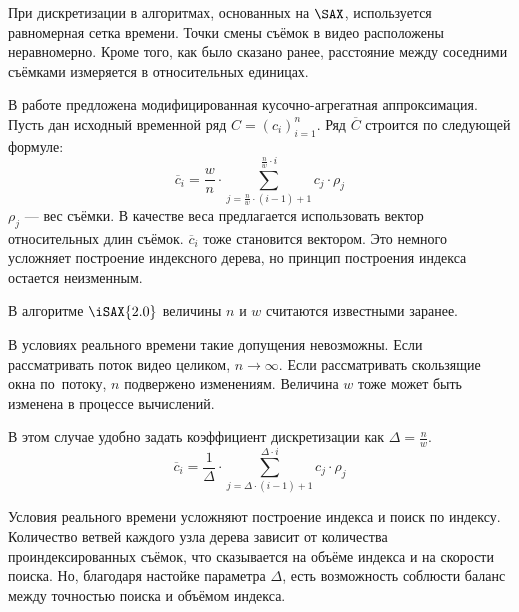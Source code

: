 \documentclass{.local/lib/classes/ndvr-super-article-standalone}
\begin{document}
 
    При дискретизации в алгоритмах, основанных на $\SAX$,  
    используется равномерная сетка времени.
    Точки смены съёмок в видео расположены неравномерно.
    Кроме того, как было сказано ранее,
    расстояние между соседними съёмками измеряется 
    в относительных единицах.

    В работе предложена модифицированная 
    кусочно-агрегатная аппроксимация. 
    Пусть дан исходный временной ряд $C = (c_{i})^{n}_{i=1}$.
    Ряд $\overline{C}$ строится по следующей формуле:
    \[
        \overline{c}_{i} 
            = \dfrac{w}{n} \cdot
                \sum
                    \limits%
                        ^{\frac{n}{w} \cdot i}%
                        _{j = \frac{n}{w} \cdot (i-1) + 1}%
                c_{j} \cdot \rho_{j}
    \] 
    $\rho_{j}$ — вес съёмки. 
    В качестве веса предлагается 
    использовать вектор относительных длин съёмок.
    $\overline{c}_{i}$ тоже становится вектором.
    Это немного усложняет построение индексного дерева,
    но принцип построения индекса остается неизменным. 

    В алгоритме $\iSAX{2.0}$ величины 
    $n$ и $w$ считаются известными заранее.

    В условиях реального времени такие допущения невозможны.
    Если рассматривать поток видео целиком, $n \to \infty$.  
    Если рассматривать скользящие окна по~потоку,
    $n$ подвержено изменениям.
    Величина $w$ тоже может быть изменена в процессе вычислений.

    В этом случае удобно задать коэффициент дискретизации
    как $\Delta = \frac{n}{w}$.
    \[
        \overline{c}_{i} 
            = \dfrac{1}{\Delta} \cdot
                \sum
                    \limits%
                        ^{\Delta \cdot i}%
                        _{j = \Delta \cdot (i-1) + 1}%
                c_{j} \cdot \rho_{j}
    \] 

    Условия реального времени усложняют 
    построение индекса и поиск по индексу.
    Количество ветвей каждого узла дерева 
    зависит от количества проиндексированных съёмок, 
    что сказывается на объёме индекса и на скорости поиска.
    Но, благодаря настойке параметра $\Delta$,
    есть возможность соблюсти баланс 
    между точностью поиска и объёмом индекса.
\end{document}
